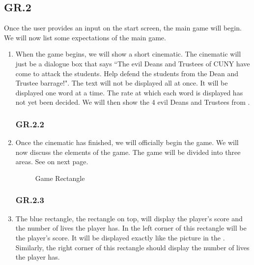 \documentclass[12pt, letterpaper]{article}
\begin{document}
    \subsection*{GR.2}
    
    Once the user provides an input on the start screen, the main game will begin. We will now list some expectations of the main game. 
    \begin{enumerate}[label=]
        \subsubsection*{GR.2.1}
        \item When the game begins, we will show a short cinematic. The cinematic will just be a dialogue box that says ``The evil Deans and Trustees of CUNY have come to attack the students. Help defend the students from the Dean and Trustee barrage!". The text will not be displayed all at once. It will be displayed one word at a time. The rate at which each word is displayed has not yet been decided. We will then show the 4 evil Deans and Trustees from .
        \subsubsection*{GR.2.2}
        \item Once the cinematic has finished, we will officially begin the game. We will now discuss the elements of the game. The game will be divided into three areas. See  on next page.
        
        
        \begin{figure}[!htb]
        \begin{center}
        \caption{Game Rectangle}
        \label{fig:game_rect}
        \end{center}
        \end{figure}
        \subsubsection*{GR.2.3}
        \item The blue rectangle, the rectangle on top, will display the player's score and the number of lives the player has. In the left corner of this rectangle will be the player's score. It will be displayed exactly like the picture in the . Similarly, the right corner of this rectangle should display the number of lives the player has. 

\end{enumerate}
\end{document}
